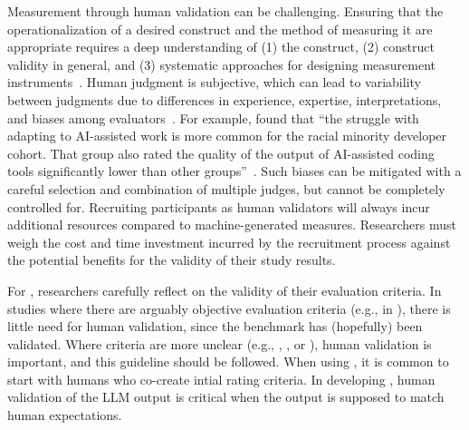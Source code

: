 Measurement through human validation can be challenging.
Ensuring that the operationalization of a desired construct and the method of measuring it are appropriate requires a deep understanding of (1) the construct, (2) construct validity in general, and (3) systematic approaches for designing measurement instruments~\cite{DBLP:journals/tse/SjobergB23}.
Human judgment is subjective, which can lead to variability between judgments due to differences in experience, expertise, interpretations, and biases among evaluators~\cite{DBLP:journals/pacmhci/McDonaldSF19}.
For example, \citeauthor{hicks_lee_foster-marks_2025} found that \enquote{the struggle with adapting to AI-assisted work is more common for the racial minority developer cohort.
That group also rated the quality of the output of AI-assisted coding tools significantly lower than other groups}~\cite{hicks_lee_foster-marks_2025}.
Such biases can be mitigated with a careful selection and combination of multiple judges, but cannot be completely controlled for.
Recruiting participants as human validators will always incur additional resources compared to machine-generated measures.
Researchers must weigh the cost and time investment incurred by the recruitment process against the potential benefits for the validity of their study results.


For \llmusage, researchers \should carefully reflect on the validity of their evaluation criteria.
In studies where there are arguably objective evaluation criteria (e.g., in \benchmarkingtasks), there is little need for human validation, since the benchmark has (hopefully) been validated.
Where criteria are more unclear (e.g., \annotators, \subjects, or \synthesis), human validation is important, and this guideline should be followed.
When using \judges, it is common to start with humans who co-create intial rating criteria. 
In developing \newtools, human validation of the LLM output is critical when the output is supposed to match human expectations.
